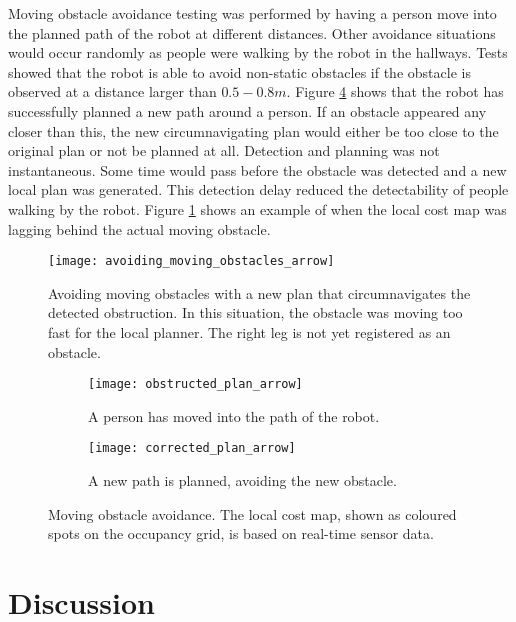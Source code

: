 Moving obstacle avoidance testing was performed by having a person move into the planned path of the robot at different distances. Other avoidance situations would occur randomly as people were walking by the robot in the hallways. Tests showed that the robot is able to avoid non-static obstacles if the obstacle is observed at a distance larger than $0.5 - 0.8 m$. Figure \ref{fig:obstacle_avoidance} shows that the robot has successfully planned a new path around a person. If an obstacle appeared any closer than this, the new circumnavigating plan would either be too close to the original plan or not be planned at all. Detection and planning was not instantaneous. Some time would pass before the obstacle was detected and a new local plan was generated. This detection delay reduced the detectability of people walking by the robot. Figure \ref{fig:avoiding_moving_obstacles} shows an example of when the local cost map was lagging behind the actual moving obstacle.



\begin{figure}[p]
	\centering
	\texttt{[image: avoiding\_moving\_obstacles\_arrow]}
	\caption{Avoiding moving obstacles with a new plan that circumnavigates the detected obstruction. In this situation, the obstacle was moving too fast for the local planner. The right leg is not yet registered as an obstacle.}
	\label{fig:avoiding_moving_obstacles}
\end{figure}

\begin{figure}
	\centering
	\begin{subfigure}[b]{0.46\textwidth}
		\texttt{[image: obstructed\_plan\_arrow]}
		\caption{A person has moved into the path of the robot.}
		\label{fig:obstructed_plan}
	\end{subfigure}
	\begin{subfigure}[b]{0.472\textwidth}
		\texttt{[image: corrected\_plan\_arrow]}
		\caption{A new path is planned, avoiding the new obstacle.}
		\label{fig:corrected_plan}
	\end{subfigure}
	\caption{Moving obstacle avoidance. The local cost map, shown as coloured spots on the occupancy grid, is based on real-time sensor data. }\label{fig:obstacle_avoidance}
\end{figure}




\section{Discussion}